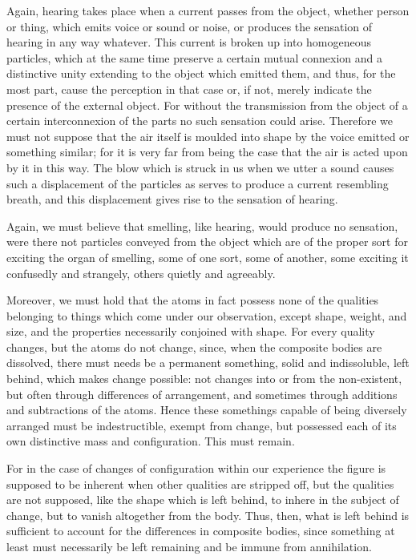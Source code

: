 \documentclass{stex}
\begin{document}
Again, hearing takes place when a current passes from the object, whether person or thing, which emits voice or sound or noise, or produces the sensation of hearing in any way whatever.
This current is broken up into homogeneous particles, which at the same time preserve a certain mutual connexion and a distinctive unity extending to the object which emitted them, and thus, for the most part, cause the perception in that case or, if not, merely indicate the presence of the external object.
For without the transmission from the object of a certain interconnexion of the parts no such sensation could arise.
Therefore we must not suppose that the air itself is moulded into shape by the voice emitted or something similar; for it is very far from being the case that the air is acted upon by it in this way.
The blow which is struck in us when we utter a sound causes such a displacement of the particles as serves to produce a current resembling breath, and this displacement gives rise to the sensation of hearing.

Again, we must believe that smelling, like hearing, would produce no sensation, were there not particles conveyed from the object which are of the proper sort for exciting the organ of smelling, some of one sort, some of another, some exciting it confusedly and strangely, others quietly and agreeably.

Moreover, we must hold that the atoms in fact possess none of the qualities belonging to things which come under our observation, except shape, weight, and size, and the properties necessarily conjoined with shape.
For every quality changes, but the atoms do not change, since, when the composite bodies are dissolved, there must needs be a permanent something, solid and indissoluble, left behind, which makes change possible: not changes into or from the non-existent, but often through differences of arrangement, and sometimes through additions and subtractions of the atoms.
Hence these somethings capable of being diversely arranged must be indestructible, exempt from change, but possessed each of its own distinctive mass and configuration.
This must remain.

For in the case of changes of configuration within our experience the figure is supposed to be inherent when other qualities are stripped off, but the qualities are not supposed, like the shape which is left behind, to inhere in the subject of change, but to vanish altogether from the body.
Thus, then, what is left behind is sufficient to account for the differences in composite bodies, since something at least must necessarily be left remaining and be immune from annihilation.
\end{document}
